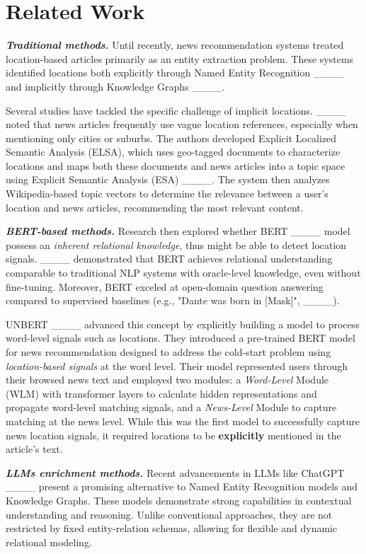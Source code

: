 \section{Related Work}
\textbf{\textit{Traditional methods.}} Until recently, news recommendation systems treated location-based articles primarily as an entity extraction problem. These systems identified locations both explicitly through Named Entity Recognition ____ and implicitly through Knowledge Graphs ____.

Several studies have tackled the specific challenge of implicit locations. ____ noted that news articles frequently use vague location references, especially when mentioning only cities or suburbs. The authors developed Explicit Localized Semantic Analysis (ELSA), which uses geo-tagged documents to characterize locations and maps both these documents and news articles into a topic space using Explicit Semantic Analysis (ESA) ____. The system then analyzes Wikipedia-based topic vectors to determine the relevance between a user's location and news articles, recommending the most relevant content.


\textbf{\textit{BERT-based methods.}} Research then explored whether BERT ____ model possess an \textit{inherent relational knowledge}, thus might be able to detect location signals. ____ demonstrated that BERT achieves relational understanding comparable to traditional NLP systems with oracle-level knowledge, even without fine-tuning. Moreover, BERT exceled at open-domain question answering compared to supervised baselines (e.g., "Dante was born in [Mask]", ____).

UNBERT ____ advanced this concept by explicitly building a model to process word-level signals such as locations. They introduced a pre-trained BERT model for news recommendation designed to address the cold-start problem using \textit{location-based signals} at the word level. Their model represented users through their browsed news text and employed two modules: a \textit{Word-Level} Module (WLM) with transformer layers to calculate hidden representations and propagate word-level matching signals, and a \textit{News-Level} Module to capture matching at the news level. While this was the first model to successfully capture news location signals, it required locations to be \textbf{explicitly} mentioned in the article's text.

\textbf{\textit{LLMs enrichment methods.}} Recent advancements in LLMs like ChatGPT ____ present a promising alternative to Named Entity Recognition models and Knowledge Graphs. These models demonstrate strong capabilities in contextual understanding and reasoning. Unlike conventional approaches, they are not restricted by fixed entity-relation schemas, allowing for flexible and dynamic relational modeling. 

